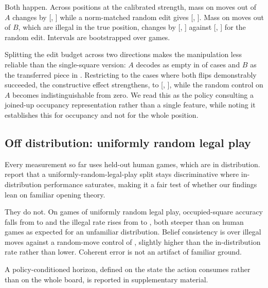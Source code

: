 \documentclass[11pt]{article}
\theoremstyle{remark}
\begin{document}
Both happen. Across  positions at the calibrated strength, mass on
moves out of $A$ changes by  [,
] while a norm-matched random edit gives 
[, ]. Mass on moves out of $B$, which
are illegal in the true position, changes by  [,
] against  [,
] for the random edit. Intervals are bootstrapped over
games.

Splitting the edit budget across two directions makes the manipulation less
reliable than the single-square version: $A$ decodes as empty in
 of cases and $B$ as the transferred piece in .
Restricting to the  cases where both flips demonstrably
succeeded, the constructive effect strengthens, to 
[, ], while the random control on $A$
becomes indistinguishable from zero. We read this as the policy consulting a
joined-up occupancy representation rather than a single feature, while noting it
establishes this for occupancy and not for the whole position.

\subsection{Off distribution: uniformly random legal play}
\label{sec:randomplay}

Every measurement so far uses held-out human games, which are in distribution.
\citet{walker2026chess} report that a uniformly-random-legal-play split stays
discriminative where in-distribution performance saturates, making it a fair test
of whether our findings lean on familiar opening theory.

They do not. On  games of uniformly random legal play,
occupied-square accuracy falls from  to  and
the illegal rate rises from  to , both
steeper than on human games as expected for an unfamiliar distribution. Belief
consistency is  over  illegal moves against a
random-move control of , slightly higher than the in-distribution
rate rather than lower. Coherent error is not an artifact of familiar ground.

A policy-conditioned horizon, defined on the state the action consumes rather than on the whole board, is reported in supplementary material.
\end{document}
